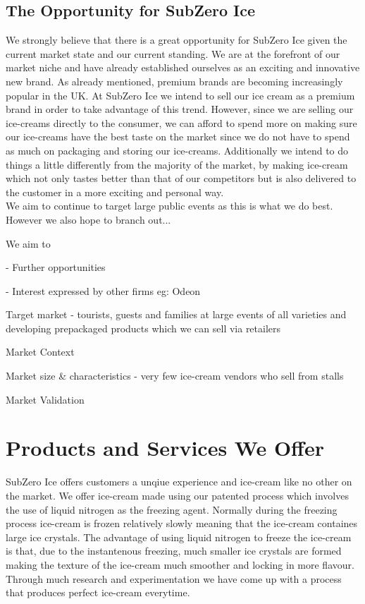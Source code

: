 \documentclass{article}
\begin{document}
  \subsection{The Opportunity for SubZero Ice}

  We strongly believe that there is a great opportunity for SubZero Ice given the current market state and our current standing. We are at the forefront of our market niche and have already established ourselves as an exciting and innovative new brand. As already mentioned, premium brands are becoming increasingly popular in the UK. At SubZero Ice we intend to sell our ice cream as a premium brand in order to take advantage of this trend. However, since we are selling our ice-creams directly to the consumer, we can afford to spend more on making sure our ice-creams have the best taste on the market since we do not have to spend as much on packaging and storing our ice-creams. Additionally we intend to do things a little differently from the majority of the market, by making ice-cream which not only tastes better than that of our competitors but is also delivered to the customer in a more exciting and personal way. \\

We aim to continue to target large public events as this is what we do best. However we also hope to branch out...

  We aim to 

   - Further opportunities

   - Interest expressed by other firms eg: Odeon

  Target market - tourists, guests and families at large events of all varieties and developing prepackaged products which we can sell via retailers

  Market Context

  Market size \& characteristics - very few ice-cream vendors who sell from stalls

  Market Validation


\section{Products and Services We Offer}

  SubZero Ice offers customers a unqiue experience and ice-cream like no other on the market. We offer ice-cream made using our patented process which involves the use of liquid nitrogen as the freezing agent. Normally during the freezing process ice-cream is frozen relatively slowly meaning that the ice-cream containes large ice crystals. The advantage of using liquid nitrogen to freeze the ice-cream is that, due to the instantenous freezing, much smaller ice crystals are formed making the texture of the ice-cream much smoother and locking in more flavour. Through much research and experimentation we have come up with a process that produces perfect ice-cream everytime. \\
\end{document}
